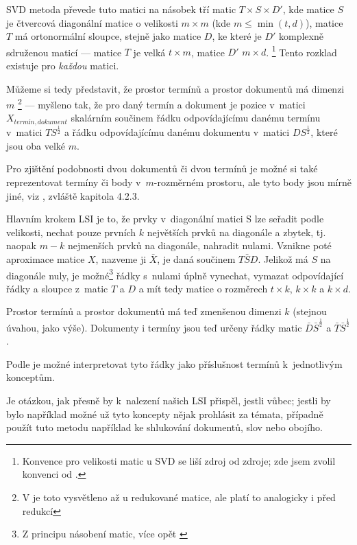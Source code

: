 \documentclass[12pt,a4paper]{report}
\begin{document}
SVD metoda převede tuto matici na násobek tří matic $T\times S \times D'$, kde matice $S$ je čtvercová diagonální matice o velikosti $m\times m$ (kde $m\le \min\left(t, d\right)$), matice $T$ má ortonormální sloupce, stejně jako matice $D$, ke které je $D'$ komplexně sdruženou maticí --- matice $T$ je velká $t \times m$, matice $D'$ $m \times d$. \footnote{Konvence pro velikosti matic u SVD se liší zdroj od zdroje; zde jsem zvolil konvenci od \cite{lsi}.} Tento rozklad existuje pro \emph{každou} matici.

Můžeme si tedy představit, že prostor termínů a prostor dokumentů má dimenzi $m$ \footnote{V \cite{lsi} je toto vysvětleno až u redukované matice, ale platí to analogicky i před redukcí} --- myšleno tak, že pro daný termín a dokument je pozice v~matici $X_{termín, dokument}$ skalárním součinem řádku odpovídajícímu danému termínu v~matici $TS^{\frac{1}{2}}$ a řádku odpovídajícímu danému dokumentu v~matici $DS^{\frac{1}{2}}$, které jsou oba velké $m$. 

Pro zjištění podobnosti dvou dokumentů či dvou termínů je možné si také reprezentovat termíny či body v~$m$-rozměrném prostoru, ale tyto body jsou mírně jiné, viz \cite{lsi}, zvláště kapitola 4.2.3.

Hlavním krokem LSI je to, že prvky v~diagonální matici S lze seřadit podle velikosti, nechat pouze prvních $k$ největších prvků na diagonále a zbytek, tj. naopak $m-k$ nejmenších prvků na diagonále, nahradit nulami. Vznikne poté aproximace matice $X$, nazveme ji $\bar{X}$, je daná součinem $T\bar{S}D$. Jelikož má $S$ na diagonále nuly, je možné\footnote{Z principu násobení matic, více opět \cite{lsi}} řádky s~nulami úplně vynechat, vymazat odpovídající řádky a sloupce z~matic $T$ a $D$ a mít tedy matice o rozměrech $t \times k$, $k \times k$ a $k \times d$.

Prostor termínů a prostor dokumentů má teď zmenšenou dimenzi $k$ (stejnou úvahou, jako výše). Dokumenty i termíny jsou teď určeny řádky matic $\bar{D}\bar{S}^{\frac{1}{2}}$ a $\bar{T}\bar{S}^{\frac{1}{2}}$.

Podle \cite{lsi} je možné interpretovat tyto řádky jako příslušnost termínů k~jednotlivým konceptům.

Je otázkou, jak přesně by k~nalezení našich  LSI přispěl, jestli vůbec; jestli by bylo například možné už tyto koncepty nějak prohlásit za témata, případně použít tuto metodu například ke shlukování dokumentů, slov nebo obojího.

\end{document}
